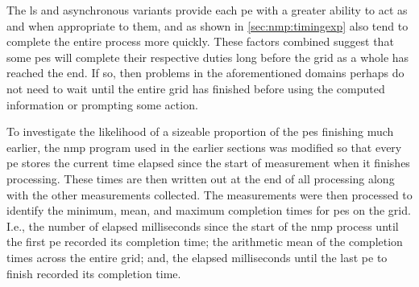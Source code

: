 The \gls{ls} and asynchronous variants provide each \gls{pe} with a greater ability to act as and when appropriate to them, and as shown in \cref{sec:nmp:timingexp} also tend to complete the entire process more quickly.  These factors combined suggest that some \glspl{pe} will complete their respective duties long before the grid as a whole has reached the end.  If so, then problems in the aforementioned domains perhaps do not need to wait until the entire grid has finished before using the computed information or prompting some action.

To investigate the likelihood of a sizeable proportion of the \glspl{pe} finishing much earlier, the \gls{nmp} program used in the earlier sections was modified so that every \gls{pe} stores the current time elapsed since the start of measurement when it finishes processing.  These times are then written out at the end of all processing along with the other measurements collected.  The measurements were then processed to identify the minimum, mean, and maximum completion times for \glspl{pe} on the grid.  I.e., the number of elapsed milliseconds since the start of the \gls{nmp} process until the first \gls{pe} recorded its completion time; the arithmetic mean of the completion times across the entire grid; and, the elapsed milliseconds until the last \gls{pe} to finish recorded its completion time.

